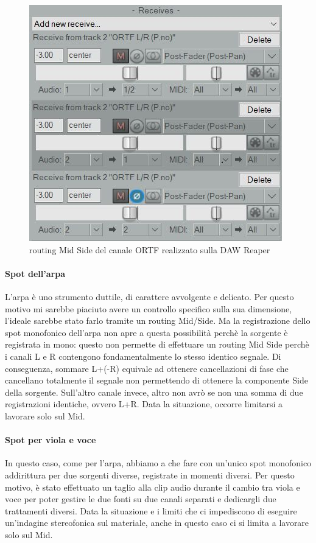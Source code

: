 		\begin{figure}[h]
			\begin{center}
				\includegraphics[width = .50\textwidth]{img/image4.jpg}
				\caption{routing Mid Side del canale ORTF realizzato sulla DAW Reaper}
			\end{center}
		\end{figure}
		
		\paragraph{Spot dell'arpa} L'arpa è uno strumento duttile, di carattere avvolgente e delicato. Per questo motivo mi sarebbe piaciuto avere un controllo specifico sulla sua dimensione, l'ideale sarebbe stato farlo tramite un routing  Mid/Side. Ma la registrazione dello spot monofonico dell'arpa non apre a questa possibilità perchè la sorgente è registrata in mono: questo non permette di effettuare un routing Mid Side perchè i canali L e R contengono fondamentalmente lo stesso identico segnale. Di conseguenza, sommare L+(-R) equivale ad ottenere cancellazioni di fase che cancellano totalmente il segnale non permettendo di ottenere la componente Side della sorgente. Sull'altro canale invece, altro non avrò se non una somma di due registrazioni identiche, ovvero L+R. Data la situazione, occorre limitarsi a lavorare solo sul Mid.
	
\newpage
		
		\paragraph{Spot per viola e voce} In questo caso, come per l'arpa, abbiamo a che fare con un'unico spot monofonico addirittura per due sorgenti diverse, registrate in momenti diversi.
		Per questo motivo, è stato effettuato un taglio alla clip audio durante il cambio tra viola e voce per poter gestire le due fonti su due canali separati e dedicargli due trattamenti diversi.
		Data la situazione e i limiti che ci impediscono di eseguire un'indagine stereofonica sul materiale, anche in questo caso ci si limita a lavorare solo sul Mid.
	
